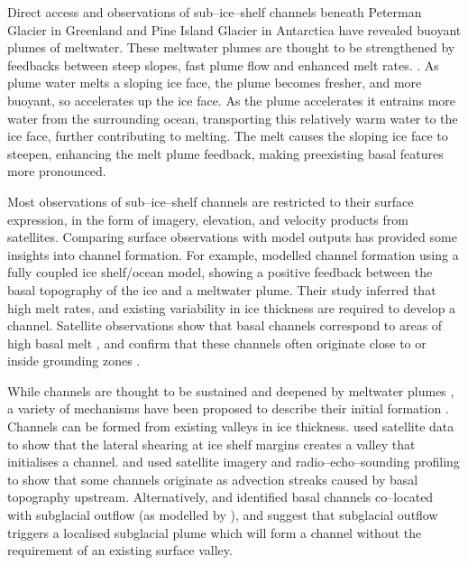 % 
Direct access and observations of sub--ice--shelf channels beneath Peterman Glacier in Greenland \citep{rignot2008channelized} and Pine Island Glacier in Antarctica \citep{stanton2013channelized} have revealed buoyant plumes of meltwater. 
These meltwater plumes are thought to be strengthened by feedbacks between steep slopes, fast plume flow and enhanced melt rates. \cite [e.g.][] {jenkins2011convection, sergienko2013basal, gladish2012ice}. As plume water melts a sloping ice face, the plume becomes fresher, and more buoyant, so accelerates up the ice face. As the plume accelerates it entrains more water from the surrounding ocean, transporting this relatively warm water to the ice face, further contributing to melting. The melt causes the sloping ice face to steepen,  enhancing the melt plume feedback, making preexisting basal features more pronounced. 

Most observations of sub--ice--shelf channels are restricted to their surface expression, in the form of imagery, elevation, and velocity products from satellites. Comparing surface observations with model outputs has provided some insights into channel formation. 
For example, \cite{sergienko2013basal} modelled channel formation using a fully coupled ice shelf/ocean model, showing a positive feedback between the basal topography of the ice and a meltwater plume. Their study inferred that high melt rates, and existing variability in ice thickness are required to develop a channel. Satellite observations show that basal channels correspond to areas of high basal melt \cite [e.g.][]{rignot2008recent}, and confirm that these channels often originate close to or inside grounding zones \citep{alley2016impacts}.

While channels are thought to be sustained and deepened by meltwater plumes \cite [e.g.][] {sergienko2013basal}, a variety of mechanisms have been proposed to describe their initial formation  \cite [e.g.][] {alley2019troughs}. 
Channels can be formed from existing valleys in ice thickness. \cite{alley2019troughs} used satellite data to show that the lateral shearing at ice shelf margins creates a valley that initialises a channel. \cite{drews2017actively} and \cite{jeofry2018hard} used satellite imagery and radio--echo--sounding profiling to show that some channels originate as advection streaks caused by basal topography upstream. 
Alternatively, \cite{alley2016impacts} and \cite{le2013evidence} identified basal channels co--located with subglacial outflow (as modelled by \cite{le2013evidence}), and suggest that subglacial outflow triggers a localised subglacial plume which will form a channel without the requirement of an existing surface valley. 


